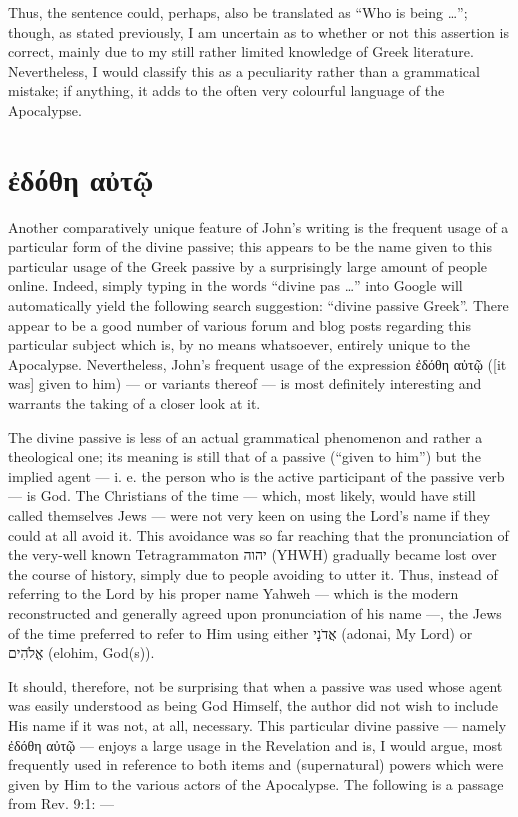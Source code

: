 Thus, the sentence could, perhaps, also be translated as “Who is being …”; though, as stated previously, I am uncertain as to whether or not this assertion is correct, mainly due to my still rather limited knowledge of Greek literature. Nevertheless, I would classify this as a peculiarity rather than a grammatical mistake; if anything, it adds to the often very colourful language of the Apocalypse.

\section*{ἐδόθη αὐτῷ}

Another comparatively unique feature of John’s writing is the frequent usage of a particular form of the divine passive; this appears to be the name given to this particular usage of the Greek passive by a surprisingly large amount of people online. Indeed, simply typing in the words “divine pas …” into Google will automatically yield the following search suggestion: “divine passive Greek”. There appear to be a good number of various forum and blog posts regarding this particular subject which is, by no means whatsoever, entirely unique to the Apocalypse. Nevertheless, John’s frequent usage of the expression ἐδόθη αὐτῷ ([it was] given to him) — or variants thereof — is most definitely interesting and warrants the taking of a closer look at it.

The divine passive is less of an actual grammatical phenomenon and rather a theological one; its meaning is still that of a passive (“given to him”) but the implied agent — i. e. the person who is the active participant of the passive verb — is God. The Christians of the time — which, most likely, would have still called themselves Jews — were not very keen on using the Lord’s name if they could at all avoid it. This avoidance was so far reaching that the pronunciation of the very-well known Tetragrammaton יהוה‎ (YHWH) gradually became lost over the course of history, simply due to people avoiding to utter it. Thus, instead of referring to the Lord by his proper name Yahweh — which is the modern reconstructed and generally agreed upon pronunciation of his name —, the Jews of the time preferred to refer to Him using either אֲדֹנָי‎ (adonai, My Lord) or אֱלֹהִים‎ (elohim, God(s)).

It should, therefore, not be surprising that when a passive was used whose agent was easily understood as being God Himself, the author did not wish to include His name if it was not, at all, necessary. This particular divine passive — namely ἐδόθη αὐτῷ — enjoys a large usage in the Revelation and is, I would argue, most frequently used in reference to both items and (supernatural) powers which were given by Him to the various actors of the Apocalypse. The following is a passage from Rev. 9:1: —


